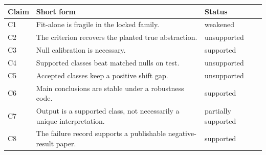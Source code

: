 \begin{tabular}{lp{8.2cm}l}
\toprule
Claim & Short form & Status \\
\midrule
C1 & Fit-alone is fragile in the locked family. & weakened \\
C2 & The criterion recovers the planted true abstraction. & unsupported \\
C3 & Null calibration is necessary. & supported \\
C4 & Supported classes beat matched nulls on test. & unsupported \\
C5 & Accepted classes keep a positive shift gap. & unsupported \\
C6 & Main conclusions are stable under a robustness code. & supported \\
C7 & Output is a supported class, not necessarily a unique interpretation. & partially supported \\
C8 & The failure record supports a publishable negative-result paper. & supported \\
\bottomrule
\end{tabular}
